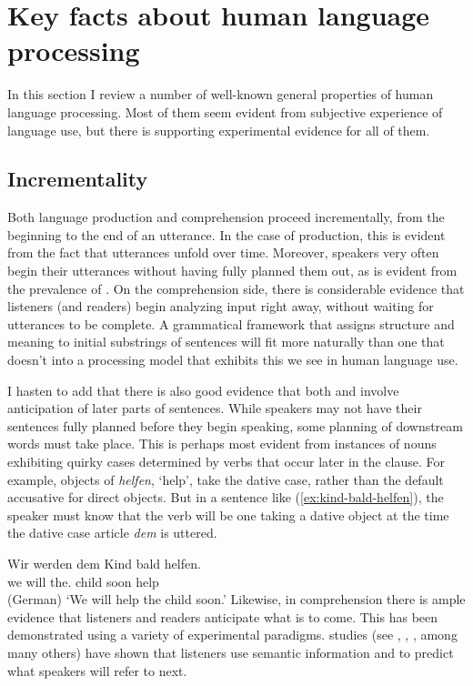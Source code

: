 \documentclass[output=paper
 	        ,biblatex
                ,babelshorthands
                ,newtxmath
                ,draftmode
                ,colorlinks, citecolor=brown
]{langscibook}
\begin{document}
\section{Key facts about human language processing}
\label{sec-key-facts}

In this section I review a number of well-known general properties of human language processing.  Most of them seem evident from subjective experience of language use, but there is supporting experimental evidence for all of them.  

\subsection{Incrementality}

\largerpage
Both language production and comprehension proceed incrementally, from the beginning to the end of
an utterance.  In the case of production, this is evident from the fact that utterances unfold over
time.  Moreover, speakers very often begin their utterances without having fully planned them out,
as is evident from the prevalence of .  On the comprehension side, there is
considerable evidence that listeners (and readers) begin analyzing input right away, without waiting
for utterances to be complete.  A grammatical framework that assigns structure and meaning to
initial substrings of sentences will fit more naturally than one that doesn't into a processing
model that exhibits this  we see in human language use.

I hasten to add that there is also good evidence that both  and 
involve anticipation of later parts of sentences.  While speakers may not have their sentences fully
planned before they begin speaking, some planning of downstream words must take place.  This is
perhaps most evident from instances of nouns exhibiting quirky cases determined by verbs that occur
later in the clause.  For example, objects of  \emph{helfen}, `help', take the dative
case, rather than the default accusative for direct objects.  But in a sentence like
(\ref{ex:kind-bald-helfen}), the speaker must know that the verb will be one taking a dative object
at the time the dative case article \emph{dem} is uttered.

\ea\label{ex:kind-bald-helfen}
\gll Wir werden dem        Kind bald helfen.\\
     we will    the.\DAT{} child soon help\\\hfill (German)
\glt `We will help the child soon.'
\z
Likewise, in comprehension there is ample evidence that listeners and readers anticipate what is to
come.  This has been demonstrated using a variety of experimental paradigms.  
studies (see \citealt{TanenhausEtal1995}, \citealt{AltmannKamide99}, \citealt{ArnoldEtal2007}, among
many others) have shown that listeners use semantic information and  to predict
what speakers will refer to next. 
\end{document}
